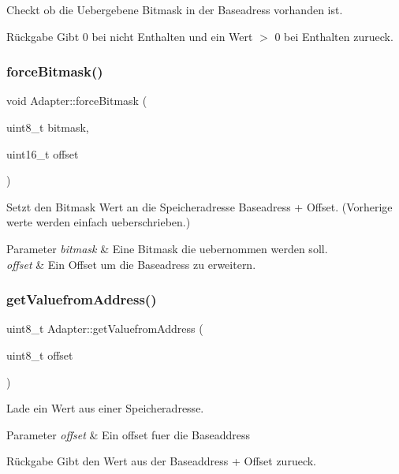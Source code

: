 Checkt ob die Uebergebene Bitmask in der Baseadress vorhanden ist.

\begin{DoxyReturn}{Rückgabe}
Gibt 0 bei nicht Enthalten und ein Wert $>$ 0 bei Enthalten zurueck. 
\end{DoxyReturn}
\hypertarget{class_adapter_afc0aa429b5f6cdd52a7e78045b3c459c}{}\label{class_adapter_afc0aa429b5f6cdd52a7e78045b3c459c} 
\subsubsection{\texorpdfstring{force\+Bitmask()}{forceBitmask()}}
{\footnotesize\ttfamily void Adapter\+::force\+Bitmask (\begin{DoxyParamCaption}\item[{uint8\+\_\+t}]{bitmask,  }\item[{uint16\+\_\+t}]{offset }\end{DoxyParamCaption})}

Setzt den Bitmask Wert an die Speicheradresse Baseadress + Offset. (Vorherige werte werden einfach ueberschrieben.)


\begin{DoxyParams}{Parameter}
{\em bitmask} & Eine Bitmask die uebernommen werden soll. \\
\hline
{\em offset} & Ein Offset um die Baseadress zu erweitern. \\
\hline
\end{DoxyParams}
\hypertarget{class_adapter_af8b131f521892341ff7a2959bf56e004}{}\label{class_adapter_af8b131f521892341ff7a2959bf56e004} 
\subsubsection{\texorpdfstring{get\+Valuefrom\+Address()}{getValuefromAddress()}}
{\footnotesize\ttfamily uint8\+\_\+t Adapter\+::get\+Valuefrom\+Address (\begin{DoxyParamCaption}\item[{uint8\+\_\+t}]{offset }\end{DoxyParamCaption})}

Lade ein Wert aus einer Speicheradresse.


\begin{DoxyParams}{Parameter}
{\em offset} & Ein offset fuer die Baseaddress\\
\hline
\end{DoxyParams}
\begin{DoxyReturn}{Rückgabe}
Gibt den Wert aus der Baseaddress + Offset zurueck. 
\end{DoxyReturn}
\hypertarget{class_adapter_a655de45764223d7b1b3847170cc405a5}{}\label{class_adapter_a655de45764223d7b1b3847170cc405a5} 
